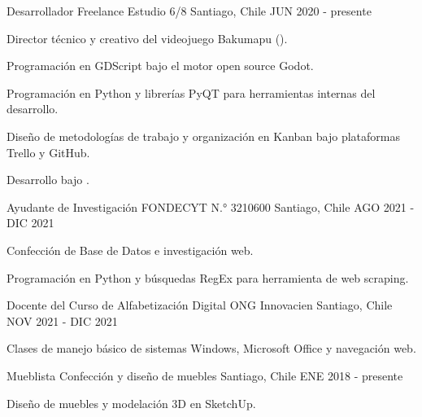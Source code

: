 

\begin{cventries}

  \cventry
    {Desarrollador Freelance} %
    {Estudio 6/8} %
    {Santiago, Chile} %
    {JUN 2020 - presente} %
    {
      \begin{cvitems} %
        \item {Director técnico y creativo del videojuego Bakumapu ().}
        \item {Programación en GDScript bajo el motor open source Godot.}
        \item {Programación en Python y librerías PyQT para herramientas internas del desarrollo.}
        \item {Diseño de metodologías de trabajo y organización en Kanban bajo plataformas Trello y GitHub.}
        \item {Desarrollo bajo .}
      \end{cvitems}
    }

  \cventry
    {Ayudante de Investigación} %
    {FONDECYT N.° 3210600} %
    {Santiago, Chile} %
    {AGO 2021 - DIC 2021} %
    {
      \begin{cvitems} %
        \item {Confección de Base de Datos e investigación web.}
        \item {Programación en Python y búsquedas RegEx para herramienta de web scraping.}
      \end{cvitems}
    }

  \cventry
    {Docente del Curso de Alfabetización Digital} %
    {ONG Innovacien} %
    {Santiago, Chile} %
    {NOV 2021 - DIC 2021} %
    {
      \begin{cvitems} %
        \item {Clases de manejo básico de sistemas Windows, Microsoft Office y navegación web.}
      \end{cvitems}
    }

  \cventry
    {Mueblista} %
    {Confección y diseño de muebles} %
    {Santiago, Chile} %
    {ENE 2018 - presente} %
    {
      \begin{cvitems} %
        \item {Diseño de muebles y modelación 3D en SketchUp.}
      \end{cvitems}
    }


\end{cventries}
